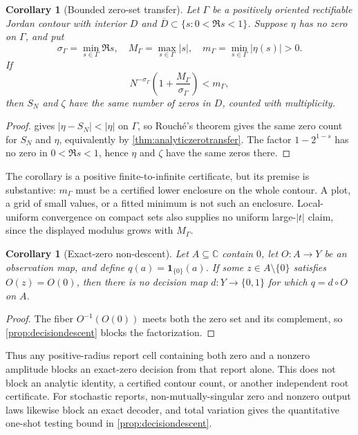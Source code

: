 \documentclass[11pt,a4paper]{article}
\theoremstyle{definition}
\theoremstyle{plain}
\newtheorem{corollary}[definition]{Corollary}
\theoremstyle{remark}
\begin{document}
\begin{corollary}[Bounded zero-set transfer]\label{cor:eta-zero-count}
Let \(\Gamma\) be a positively oriented rectifiable Jordan contour with
interior \(D\) and
\(\overline D\subset\{s:0<\Re s<1\}\).  Suppose \(\eta\) has no zero on
\(\Gamma\), and put
\[
 \sigma_\Gamma=\min_{s\in\Gamma}\Re s,\quad
 M_\Gamma=\max_{s\in\Gamma}|s|,\quad
 m_\Gamma=\min_{s\in\Gamma}|\eta(s)|>0.
\]
If
\[
 N^{-\sigma_\Gamma}
 \left(1+\frac{M_\Gamma}{\sigma_\Gamma}\right)<m_\Gamma,
\]
then \(S_N\) and \(\zeta\) have the same number of zeros in \(D\), counted
with multiplicity.
\end{corollary}
\begin{proof}
 gives
\(|\eta-S_N|<|\eta|\) on \(\Gamma\), so Rouch\'e's theorem gives the same
zero count for \(S_N\) and \(\eta\), equivalently by
\cref{thm:analyticzerotransfer}.  The factor \(1-2^{1-s}\) has no zero in
\(0<\Re s<1\), hence \(\eta\) and \(\zeta\) have the same zeros there.
\end{proof}

The corollary is a positive finite-to-infinite certificate, but its premise is
substantive: \(m_\Gamma\) must be a certified lower enclosure on the whole
contour.  A plot, a grid of small values, or a fitted minimum is not such an
enclosure.  Local-uniform convergence on compact sets also supplies no
uniform large-\(|t|\) claim, since the displayed modulus grows with
\(M_\Gamma\).

\begin{corollary}[Exact-zero non-descent]\label{prop:zero-nondesc}
Let \(A\subseteq\mathbb C\) contain \(0\), let \(O:A\to Y\) be an observation
map, and define \(q(a)=\mathbf 1_{\{0\}}(a)\).  If some
\(z\in A\setminus\{0\}\) satisfies \(O(z)=O(0)\), then there is no decision map
\(d:Y\to\{0,1\}\) for which \(q=d\circ O\) on \(A\).
\end{corollary}
\begin{proof}
The fiber \(O^{-1}(O(0))\) meets both the zero set and its complement, so
\cref{prop:decisiondescent} blocks the factorization.
\end{proof}
Thus any positive-radius report cell containing both zero and a nonzero
amplitude blocks an exact-zero decision from that report alone.  This does not
block an analytic identity, a certified contour count, or another independent
root certificate.  For stochastic reports, non-mutually-singular zero and
nonzero output laws likewise block an exact decoder, and total variation gives
the quantitative one-shot testing bound in \cref{prop:decisiondescent}.
\end{document}
